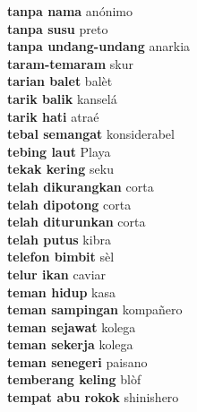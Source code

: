\textbf{ tanpa nama  } anónimo \\
\textbf{ tanpa susu  } preto \\
\textbf{ tanpa undang-undang  } anarkia \\
\textbf{ taram-temaram  } skur \\
\textbf{ tarian balet  } balèt \\
\textbf{ tarik balik  } kanselá \\
\textbf{ tarik hati  } atraé \\
\textbf{ tebal semangat  } konsiderabel \\
\textbf{ tebing laut  } Playa \\
\textbf{ tekak kering  } seku \\
\textbf{ telah dikurangkan  } corta \\
\textbf{ telah dipotong  } corta \\
\textbf{ telah diturunkan  } corta \\
\textbf{ telah putus  } kibra \\
\textbf{ telefon bimbit  } sèl \\
\textbf{ telur ikan  } caviar \\
\textbf{ teman hidup  } kasa \\
\textbf{ teman sampingan  } kompañero \\
\textbf{ teman sejawat  } kolega \\
\textbf{ teman sekerja  } kolega \\
\textbf{ teman senegeri  } paisano \\
\textbf{ temberang keling  } blòf \\
\textbf{ tempat abu rokok  } shinishero \\
